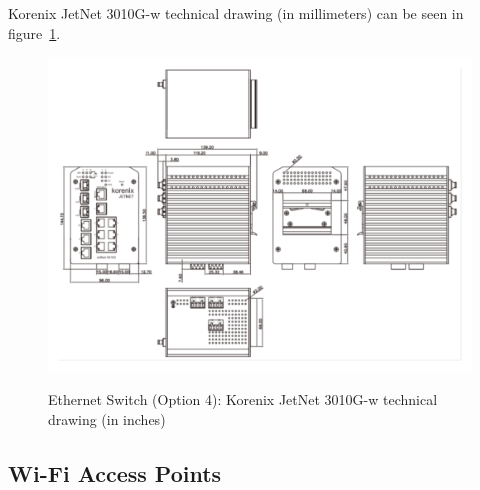 Korenix JetNet 3010G-w technical drawing (in millimeters) can be seen in figure~\ref{FIG:DEVICESWITCHOPTION4DRAWING}.
\begin{figure}
  \centering
  \includegraphics[angle=90,width=1\columnwidth]{figs/body02/FIGDEVICESWITCHOPTION4DRAWING.pdf}\\
  \caption[Ethernet Switch (Option 4): Korenix JetNet 3010G-w technical drawing (in inches)]{Ethernet Switch (Option 4): Korenix JetNet 3010G-w technical drawing (in inches)}
  \label{FIG:DEVICESWITCHOPTION4DRAWING}
\end{figure}
\subsection{Wi-Fi Access Points}  \label{DEVICE:WIFI}
